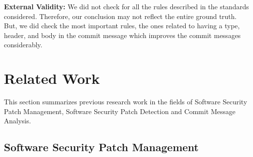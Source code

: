 \textbf{External Validity:} We did not check for all the rules described in the standards considered. Therefore, our conclusion may not reflect the entire ground truth. But, we did check the most important rules, the ones related to having a type, header, and body in the commit message which improves the commit messages considerably.




\section{Related Work}\label{sec:rw}

This section summarizes previous research work in the fields
of Software Security Patch Management, Software Security Patch
Detection and Commit Message Analysis.

\subsection{Software Security Patch Management}

